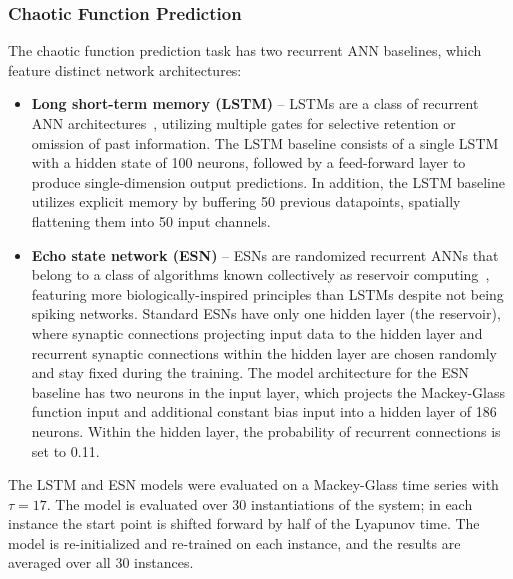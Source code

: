\subsubsection*{Chaotic Function Prediction}


The chaotic function prediction task has two recurrent ANN baselines, which feature distinct network architectures:

\begin{itemize}
        \item \textbf{Long short-term memory (LSTM)} -- LSTMs are a class of recurrent ANN architectures~\cite{Hochreiter1997}, utilizing multiple gates for selective retention or omission of past information. The LSTM baseline consists of a single LSTM with a hidden state of 100 neurons, followed by a feed-forward layer to produce single-dimension output predictions. 
        In addition, the LSTM baseline utilizes explicit memory by buffering 50 previous datapoints, spatially flattening them into 50 input channels.
        
        \item \textbf{Echo state network (ESN)} -- ESNs are randomized recurrent ANNs that belong to a class of algorithms known collectively as reservoir computing~\cite{ScardapaneRandomness2017}, featuring more biologically-inspired principles than LSTMs despite not being spiking networks. Standard ESNs have only one hidden layer (the reservoir), where synaptic connections projecting input data to the hidden layer and recurrent synaptic connections within the hidden layer are chosen randomly and stay fixed during the training. 
        The model architecture for the ESN baseline has two neurons in the input layer, which projects the Mackey-Glass function input and additional constant bias input into a hidden layer of 186 neurons. Within the hidden layer, the probability of recurrent connections is set to 0.11. 
        
        
    
    \end{itemize}
The LSTM and ESN models were evaluated on a Mackey-Glass time series with $\tau=17$. The model is evaluated over 30 instantiations of the system; in each instance the start point is shifted forward by half of the Lyapunov time. The model is re-initialized and re-trained on each instance, and the results are averaged over all 30 instances. 

